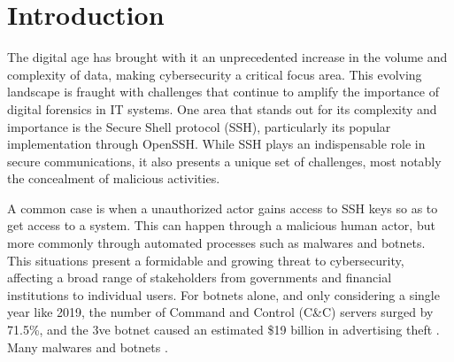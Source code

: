 \section{Introduction}\label{chap:introduction}



The digital age has brought with it an unprecedented increase in the volume and complexity of data, making cybersecurity a critical focus area. This evolving landscape is fraught with challenges that continue to amplify the importance of digital forensics in IT systems. One area that stands out for its complexity and importance is the Secure Shell protocol (SSH), particularly its popular implementation through OpenSSH. While SSH plays an indispensable role in secure communications, it also presents a unique set of challenges, most notably the concealment of malicious activities.

A common case is when a unauthorized actor gains access to SSH keys so as to get access to a system. This can happen through a malicious human actor, but more commonly through automated processes such as malwares and botnets. This situations present a formidable and growing threat to cybersecurity, affecting a broad range of stakeholders from governments and financial institutions to individual users. For botnets alone, and only considering a single year like 2019, the number of Command and Control (C\&C) servers surged by 71.5\%, and the 3ve botnet caused an estimated \$19 billion in advertising theft \cite{SSHBotnetInfect21}. Many malwares and botnets  \cite{SSHBotnetInfect21}. 

